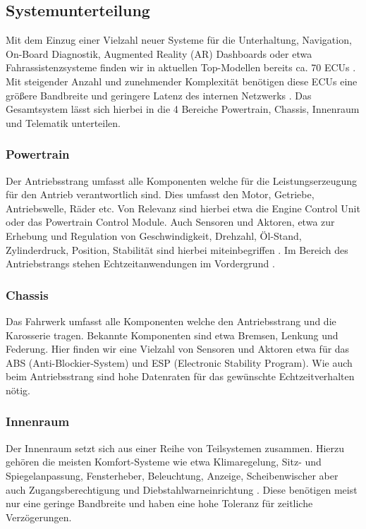     \subsection{Systemunterteilung}
    Mit dem Einzug einer Vielzahl neuer Systeme für die Unterhaltung, Navigation, On-Board Diagnostik,
    Augmented Reality (AR) Dashboards oder etwa Fahrassistenzsysteme finden wir in aktuellen Top-Modellen bereits 
    ca. 70 ECUs \cite{ivn quellen}. Mit steigender Anzahl und zunehmender Komplexität 
    benötigen diese ECUs eine größere Bandbreite und geringere Latenz des internen Netzwerks \cite{in vehivle networking}.
    Das Gesamtsystem lässt sich hierbei in die 4 Bereiche Powertrain, Chassis, Innenraum und Telematik unterteilen.
        \subsubsection{Powertrain}
        Der Antriebsstrang umfasst alle Komponenten welche für die Leistungserzeugung für den Antrieb verantwortlich sind. Dies umfasst 
        den Motor, Getriebe, Antriebswelle, Räder etc. Von Relevanz sind hierbei etwa die Engine Control Unit oder das Powertrain Control Module.
        Auch Sensoren und Aktoren, etwa zur Erhebung und Regulation von Geschwindigkeit, Drehzahl, Öl-Stand, Zylinderdruck, Position, Stabilität sind hierbei miteinbegriffen \cite{IVN}.
        Im Bereich des Antriebstrangs stehen Echtzeitanwendungen im Vordergrund \cite{Bosch}.
        \subsubsection{Chassis}
        Das Fahrwerk umfasst alle Komponenten welche den Antriebsstrang und die Karosserie tragen. Bekannte Komponenten sind etwa
        Bremsen, Lenkung und Federung. Hier finden wir eine Vielzahl von Sensoren und Aktoren etwa für das ABS (Anti-Blockier-System) und ESP (Electronic Stability Program).
        Wie auch beim Antriebsstrang sind hohe Datenraten für das gewünschte Echtzeitverhalten nötig.
        \subsubsection{Innenraum}
        Der Innenraum setzt sich aus einer Reihe von Teilsystemen zusammen. Hierzu gehören die meisten Komfort-Systeme wie etwa Klimaregelung, Sitz- und Spiegelanpassung, Fensterheber, Beleuchtung,
        Anzeige, Scheibenwischer aber auch Zugangsberechtigung und Diebstahlwarneinrichtung \cite{Bosch}. 
        Diese benötigen meist nur eine geringe Bandbreite und haben eine hohe Toleranz für zeitliche Verzögerungen.
